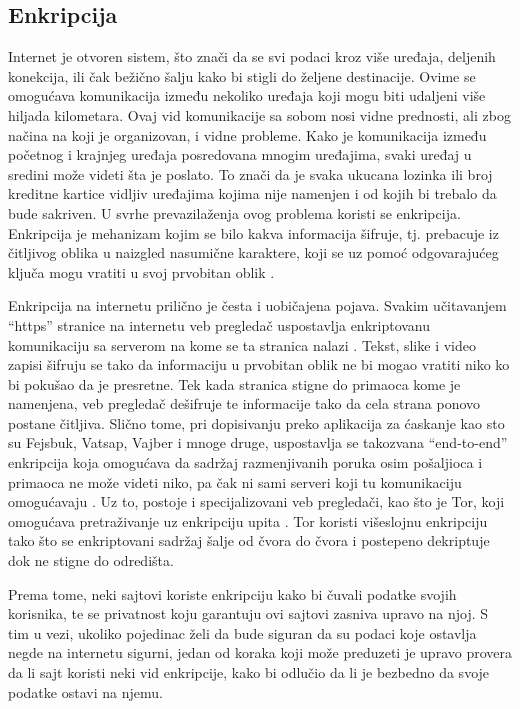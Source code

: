 \documentclass[a4paper]{article}
\begin{document}
\subsection{Enkripcija} 
Internet je otvoren sistem, što znači da se svi podaci kroz više uređaja, deljenih konekcija, ili čak bežično šalju kako bi stigli do željene destinacije. Ovime se omogućava komunikacija između nekoliko uređaja koji mogu biti udaljeni više hiljada kilometara. Ovaj vid komunikacije sa sobom nosi vidne prednosti, ali zbog načina na koji je organizovan, i vidne probleme. Kako je komunikacija između početnog i krajnjeg uređaja posredovana mnogim uređajima, svaki uređaj u sredini može videti šta je poslato. To znači da je svaka ukucana lozinka ili broj kreditne kartice vidljiv uređajima kojima nije namenjen i od kojih bi trebalo da bude sakriven. U svrhe prevazilaženja ovog problema koristi se enkripcija. Enkripcija je mehanizam kojim se bilo kakva informacija šifruje, tj. prebacuje iz čitljivog oblika u naizgled nasumične karaktere, koji se uz pomoć odgovarajućeg ključa mogu vratiti u svoj prvobitan oblik \cite{dataencryption}. 
\par Enkripcija na internetu prilično je česta i uobičajena pojava. Svakim učitavanjem “https” stranice na internetu veb pregledač uspostavlja enkriptovanu komunikaciju sa serverom na kome se ta stranica nalazi \cite{enc1}. Tekst, slike i video zapisi šifruju se tako da informaciju u prvobitan oblik ne bi mogao vratiti niko ko bi pokušao da je presretne. Tek kada stranica stigne do primaoca kome je namenjena, veb pregledač dešifruje te informacije tako da cela strana ponovo postane čitljiva. Slično tome, pri dopisivanju preko aplikacija za ćaskanje kao sto su Fejsbuk, Vatsap, Vajber i mnoge druge, uspostavlja se takozvana “end-to-end” enkripcija koja omogućava da sadržaj razmenjivanih poruka osim pošaljioca i primaoca ne može videti niko, pa čak ni sami serveri koji tu komunikaciju omogućavaju \cite{enc2}. Uz to, postoje i specijalizovani veb pregledači, kao što je Tor, koji omogućava pretraživanje uz enkripciju upita \cite{enc3}. Tor koristi višeslojnu enkripciju tako što se enkriptovani sadržaj šalje od čvora do čvora i postepeno dekriptuje dok ne stigne do odredišta.
\par Prema tome, neki sajtovi koriste enkripciju kako bi čuvali podatke svojih korisnika, te se privatnost koju garantuju ovi sajtovi zasniva upravo na njoj. S tim u vezi, ukoliko pojedinac želi da bude siguran da su podaci koje ostavlja negde na internetu sigurni, jedan od koraka koji može preduzeti je upravo provera da li sajt koristi neki vid enkripcije, kako bi odlučio da li je bezbedno da svoje podatke ostavi na njemu. 
\end{document}
